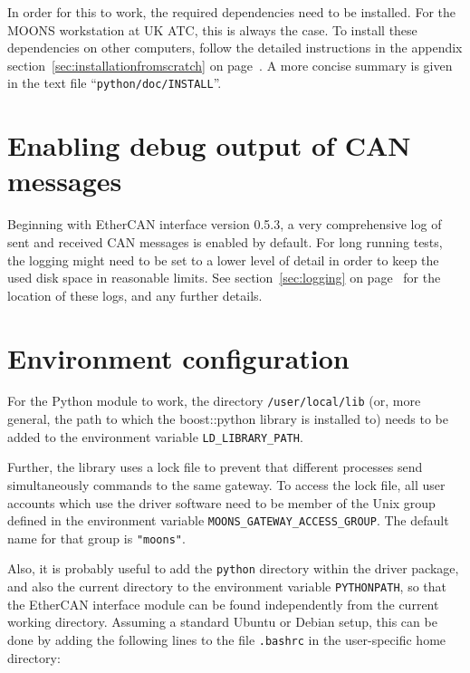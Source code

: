 \documentclass[fontsize=12,a4paper]{scrreprt}
\begin{document}
In order for this to work, the required dependencies need to be
installed. For the MOONS workstation at UK ATC, this is always the
case. To install these dependencies on other computers, follow the
detailed instructions in the appendix
section~\ref{sec:installationfromscratch} on
page~\pageref{sec:installationfromscratch}.  A more concise summary is
given in the text file ``\texttt{python/doc/INSTALL}''.

\section{Enabling debug output of CAN messages}

Beginning with EtherCAN interface version 0.5.3, a very comprehensive
log of sent and received CAN messages is enabled by default. For long
running tests, the logging might need to be set to a lower level of
detail in order to keep the used disk space in reasonable limits.  See
section~\ref{sec:logging} on page~\pageref{sec:logging} for the
location of these logs, and any further details.


\section{Environment configuration}
\label{sec:environmentconfiguration}

For the Python module to work, the directory \texttt{/user/local/lib}
(or, more general, the path to which the boost::python library is
installed to) needs to be added to the environment variable
\texttt{LD\_LIBRARY\_PATH}.

Further, the library uses a lock file to prevent that different
processes send simultaneously commands to the same gateway. To access
the lock file, all user accounts which use the driver software need to
be member of the Unix group defined in the environment variable
\texttt{MOONS\_GATEWAY\_ACCESS\_GROUP}. The default name for that
group is \texttt{"moons"}.

Also, it is probably useful to add the \texttt{python} directory
within the driver package, and also the current directory to the
environment variable \texttt{PYTHONPATH}, so that the EtherCAN
interface module can be found independently from the current working
directory.  Assuming a standard Ubuntu or Debian setup, this can be
done by adding the following lines to the file \texttt{.bashrc} in the
user-specific home directory:
\end{document}
